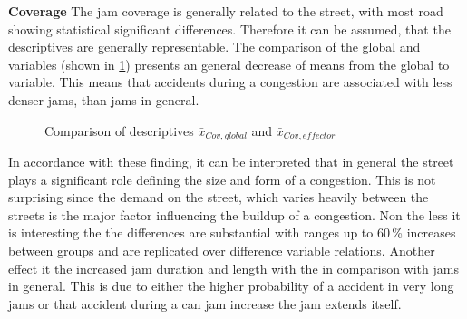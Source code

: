 \textbf{Coverage} The jam coverage is generally related to the street, with most road showing statistical significant differences. Therefore it can be assumed, that the descriptives are generally representable. The comparison of the global and  variables (shown in \cref{fig:baysis_summary_Str_coverage_barplot}) presents an general decrease of means from the global to  variable. This means that accidents during a congestion are associated with less denser jams, than jams in general.
\begin{figure}[ht!]
    \data
    \pgfplotstablesort[sort key=means, sort cmp=float >]{\datasorted}{\data}
    \tiny
    \centering
    \caption{Comparison of descriptives $\bar{x}_{Cov,global}$ and $\bar{x}_{Cov,effector}$}
    \label{fig:baysis_summary_Str_coverage_barplot}
\end{figure}
In accordance with these finding, it can be interpreted that in general the street plays a significant role defining the size and form of a congestion. This is not surprising since the demand on the street, which varies heavily between the streets is the major factor influencing the buildup of a congestion. Non the less it is interesting the the differences are substantial with ranges up to 60\,\% increases between groups and are replicated over difference variable relations. Another effect it the increased jam duration and length with the  in comparison with jams in general. This is due to either the higher probability of a accident in very long jams or that accident during a can jam increase the jam extends itself.

